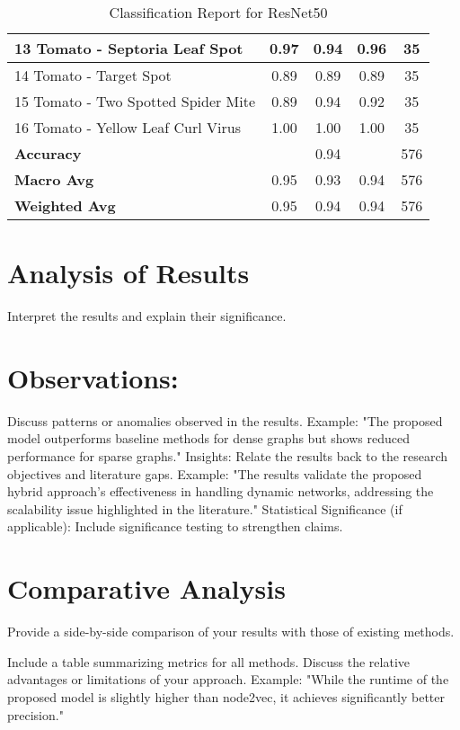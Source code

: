 \begin{table}[h!]
{\begin{tabular}{|l|c|c|c|c|}
    13 Tomato - Septoria Leaf Spot                    & 0.97               & 0.94            & 0.96              & 35               \\ \hline
    14 Tomato - Target Spot                           & 0.89               & 0.89            & 0.89              & 35               \\ \hline
    15 Tomato - Two Spotted Spider Mite               & 0.89               & 0.94            & 0.92              & 35               \\ \hline
    16 Tomato - Yellow Leaf Curl Virus                & 1.00               & 1.00            & 1.00              & 35               \\ \hline
    \textbf{Accuracy}                                 & \multicolumn{3}{c|}{0.94}            & 576              \\ \hline
    \textbf{Macro Avg}                                & 0.95               & 0.93            & 0.94              & 576              \\ \hline
    \textbf{Weighted Avg}                             & 0.95               & 0.94            & 0.94              & 576              \\ \hline
    \end{tabular}%
    }
    \caption{Classification Report for ResNet50}
    \label{tab:classification_report_rn50}
    \end{table}
    
    

\section{ Analysis of Results}
 Interpret the results and explain their significance.

\section{Observations:} Discuss patterns or anomalies observed in the results.
Example: "The proposed model outperforms baseline methods for dense graphs but shows reduced performance for sparse graphs."
Insights: Relate the results back to the research objectives and literature gaps.
Example: "The results validate the proposed hybrid approach's effectiveness in handling dynamic networks, addressing the scalability issue highlighted in the literature."
Statistical Significance (if applicable): Include significance testing to strengthen claims.
\section{ Comparative Analysis}
 Provide a side-by-side comparison of your results with those of existing methods.

Include a table summarizing metrics for all methods.
Discuss the relative advantages or limitations of your approach.
Example: "While the runtime of the proposed model is slightly higher than node2vec, it achieves significantly better precision."